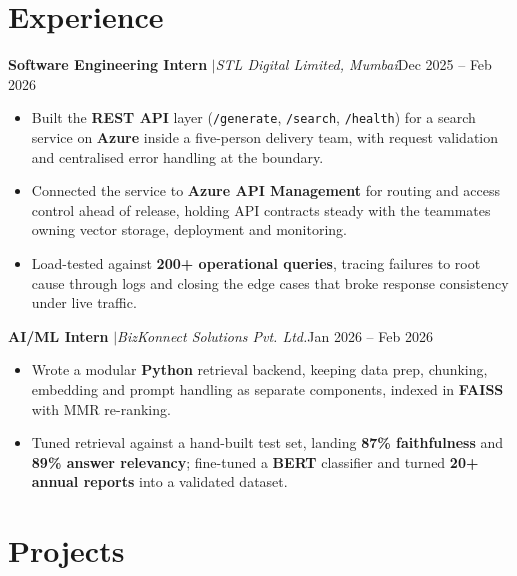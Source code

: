 \documentclass[a4paper,10pt]{article}
\newcommand{\entrygap}{\vspace{4pt}}
\newcommand{\sep}{\unskip\hspace{0.5em}$|$\hspace{0.5em}\ignorespaces}
\newlength{\entryindent}\setlength{\entryindent}{10pt}
\newcommand{\entry}[2]{\hspace*{\entryindent}#1\hfill #2\par}
\begin{document}

\section*{Experience}

\entry{\textbf{Software Engineering Intern} \sep \textit{STL Digital Limited, Mumbai}}{Dec 2025 -- Feb 2026}
\begin{itemize}
    \item Built the \textbf{REST API} layer (\texttt{/generate}, \texttt{/search}, \texttt{/health}) for a search service on \textbf{Azure} inside a five-person delivery team, with request validation and centralised error handling at the boundary.
    \item Connected the service to \textbf{Azure API Management} for routing and access control ahead of release, holding API contracts steady with the teammates owning vector storage, deployment and monitoring.
    \item Load-tested against \textbf{200+ operational queries}, tracing failures to root cause through logs and closing the edge cases that broke response consistency under live traffic.
\end{itemize}
\entrygap
\entry{\textbf{AI/ML Intern} \sep \textit{BizKonnect Solutions Pvt. Ltd.}}{Jan 2026 -- Feb 2026}
\begin{itemize}
    \item Wrote a modular \textbf{Python} retrieval backend, keeping data prep, chunking, embedding and prompt handling as separate components, indexed in \textbf{FAISS} with MMR re-ranking.
    \item Tuned retrieval against a hand-built test set, landing \textbf{87\% faithfulness} and \textbf{89\% answer relevancy}; fine-tuned a \textbf{BERT} classifier and turned \textbf{20+ annual reports} into a validated dataset.
\end{itemize}


\section*{Projects}
\end{document}

